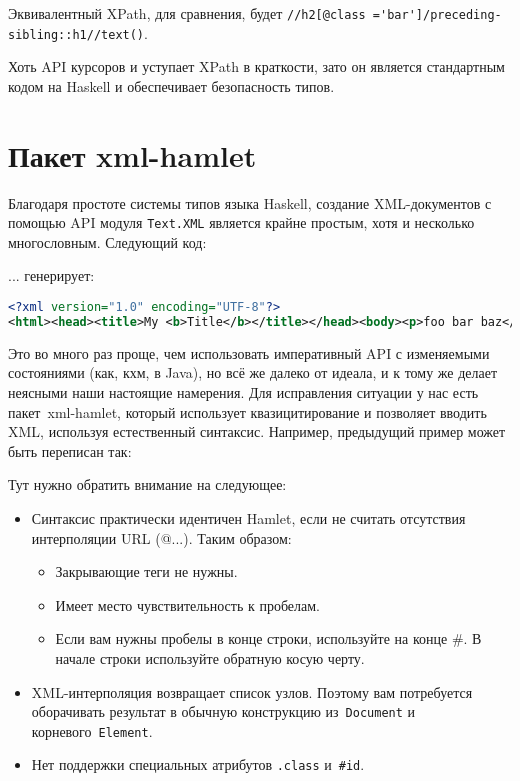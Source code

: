 \begin{remark}
    Эквивалентный XPath, для сравнения, будет
    \lstinline!//h2[@class ='bar']/preceding-sibling::h1//text()!.
\end{remark}

Хоть API курсоров и уступает XPath в краткости, зато он является стандартным
кодом на Haskell и обеспечивает безопасность типов.

\section{Пакет xml-hamlet}
Благодаря простоте системы типов языка Haskell, создание XML-документов с
помощью API модуля \lstinline!Text.XML! является крайне простым, хотя и
несколько многословным. Следующий код:


... генерирует:

\begin{lstlisting}[language=XML]
<?xml version="1.0" encoding="UTF-8"?>
<html><head><title>My <b>Title</b></title></head><body><p>foo bar baz</p></body></html>
\end{lstlisting}

Это во много раз проще, чем использовать императивный API с изменяемыми
состояниями (как, кхм, в Java), но всё же далеко от идеала, и к тому же делает
неясными наши настоящие намерения. Для исправления ситуации у нас есть
пакет~xml-hamlet, который использует квазицитирование и позволяет вводить XML,
используя естественный синтаксис. Например, предыдущий пример может быть
переписан так:


Тут нужно обратить внимание на следующее:
\begin{itemize}
  \item Синтаксис практически идентичен Hamlet, если не считать отсутствия
      интерполяции URL (@{...}). Таким образом:
    \begin{itemize}
      \item Закрывающие теги не нужны.

      \item Имеет место чувствительность к пробелам.

      \item Если вам нужны пробелы в конце строки, используйте на конце \#. В
          начале строки используйте обратную косую черту.
    \end{itemize}

  \item XML-интерполяция возвращает список узлов. Поэтому вам потребуется
      оборачивать результат в обычную конструкцию из~\lstinline!Document! и
      корневого~\lstinline!Element!.

  \item Нет поддержки специальных атрибутов \lstinline!.class!
      и~\lstinline!#id!.
\end{itemize}

